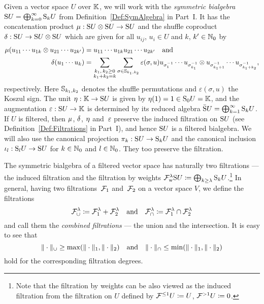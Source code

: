 \documentclass[\MainFolder/Text.tex]{subfiles}
\begin{document}
Given a vector space $U$ over $\mathbb{K}$, we will work with the \emph{symmetric bialgebra} $\mathrm{S} U = \bigoplus_{k=0}^\infty \mathrm{S}_k U$ from Definition~\ref{Def:SymAlgebra} in Part~I. It has the concatenation product $\mu: \mathrm{S} U \otimes \mathrm{S} U \rightarrow \mathrm{S} U$ and the shuffle coproduct $\delta: \mathrm{S} U \rightarrow \mathrm{S} U \otimes \mathrm{S} U$ which are given for all $u_{ij}$, $u_i \in U$ and $k$, $k'\in \mathbb{N}_0$ by
\begin{align*}
\mu(u_{11}\dotsb u_{1k} \otimes u_{21} \dotsb u_{2k'}) &= u_{11} \dotsb u_{1k} u_{21} \dotsb u_{2k'}\quad \text{and}\\
\delta(u_1 \dotsb u_k) &= \sum_{\substack{k_1,\,k_2 \ge 0\\ k_1 + k_2 = k}} \sum_{\sigma\in \mathbb{S}_{k_1, k_2}} \varepsilon(\sigma,u) u_{\sigma^{-1}_1} \dotsb u_{\sigma_{k_1}^{-1}}\otimes u_{\sigma_{k_1+1}^{-1}}\dotsb u_{\sigma_{k_1 + k_2}^{-1}},
\end{align*}
respectively. Here $\mathbb{S}_{k_1,k_2}$ denotes the shuffle permutations and $\varepsilon(\sigma,u)$ the Koszul sign. The unit $\eta: \mathbb{K} \rightarrow \mathrm{S} U$ is given by $\eta(1) = 1 \in \mathrm{S}_0 U = \mathbb{K}$, and the augmentation $\varepsilon: \mathrm{S} U \rightarrow \mathbb{K}$ is determined by its reduced algebra $\bar{\mathrm{S}} U = \bigoplus_{k=1}^\infty \mathrm{S}_k U$. If $U$ is filtered, then $\mu$, $\delta$, $\eta$ and~$\varepsilon$ preserve the induced filtration on $\mathrm{S} U$ (see Definition~\ref{Def:Filtrations} in Part~I), and hence $\mathrm{S} U$ is a filtered bialgebra. We will also use the canonical projection $\pi_k: \mathrm{S} U \rightarrow \mathrm{S}_k U$ and the canonical inclusion $\iota_l: \mathrm{S}_l U \rightarrow \mathrm{S} U$ for $k\in\mathbb{N}_0$ and $l\in \mathbb{N}_0$. They too preserve the filtration.

The symmetric bialgebra of a filtered vector space has naturally two filtrations --- the induced filtration and the filtration by weights $\mathcal{F}_{\mathrm{w}}^\lambda \mathrm{S} U \coloneqq \bigoplus_{k\ge \lambda} \mathrm{S}_k U$.\footnote{Note that the filtration by weights can be also viewed as the induced filtration from the filtration on $U$ defined by $\mathcal{F}^{\le 1}U \coloneqq U$, $\mathcal{F}^{>1}U\coloneqq 0$.} In general, having two filtrations~$\mathcal{F}_1$ and~$\mathcal{F}_2$ on a vector space $V$, we define the filtrations
\begin{equation}\label{Eq:CombinedFiltr}
\mathcal{F}_\cup^\lambda \coloneqq \mathcal{F}_1^\lambda + \mathcal{F}_2^\lambda\quad\text{and}\quad\mathcal{F}_\cap^{\lambda} \coloneqq \mathcal{F}_1^\lambda \cap \mathcal{F}_2^\lambda
\end{equation}
and call them the \emph{combined filtrations} --- the union and the intersection. It is easy to see that 
\[ \| \cdot \|_\cup \ge \max(\| \cdot \|_1,\| \cdot \|_{2})\quad\text{and}\quad\| \cdot \|_\cap \le \min(\| \cdot \|_1,\| \cdot \|_{2}) \]
hold for the corresponding filtration degrees.
\end{document}
